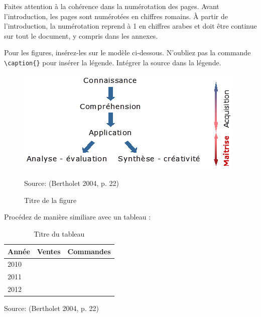 Faites attention à la cohérence dans la numérotation des pages. Avant l'introduction, les pages sont numérotées en chiffres romains. À partir de l'introduction, la numérotation reprend à 1 en chiffres arabes et doit être continue sur tout le document, y compris dans les annexes.

Pour les figures, insérez-les sur le modèle ci-dessous. N'oubliez pas la commande \verb?\caption{}? pour insérer la légende. Intégrer la source dans la légende.

\begin{figure}[H]
	\noindent \begin{centering}
		\caption{Titre de la figure}
		\bigskip{}
			\includegraphics{images/image3.png}\bigskip{}
	\par \end{centering}
	\noindent \begin{raggedleft}
		Source: (Bertholet 2004, p. 22) %
	\par \end{raggedleft}
\end{figure}

Procédez de manière similiare avec un tableau :

\begin{table}[H]
	\noindent \begin{centering}
	\caption{Titre du tableau}
	\bigskip{}
		\begin{tabular}{|m{}|m{}|m{0.4\textwidth}|}
			\hline
			\textbf{Année} & \textbf{Ventes} & \textbf{Commandes} \\
			\hline
			2010 &  &  \\
			\hline
			2011 &  &  \\
			\hline
			2012 & & \\
			\hline
		\end{tabular}
		\bigskip{}
	\par\end{centering}
	\noindent \begin{raggedleft}
		Source: (Bertholet 2004, p. 22) %
	\par\end{raggedleft}
\end{table}

